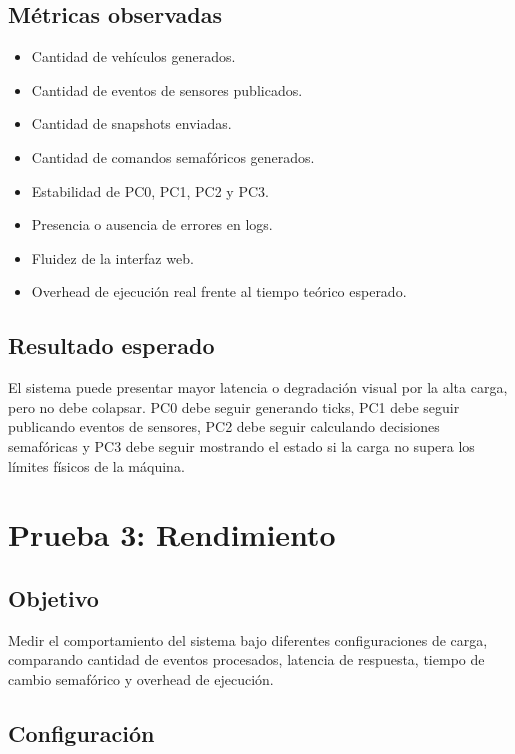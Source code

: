 \documentclass[12pt, a4paper]{article}
\begin{document}
\subsection{Métricas observadas}

\begin{itemize}
    \item Cantidad de vehículos generados.
    \item Cantidad de eventos de sensores publicados.
    \item Cantidad de snapshots enviadas.
    \item Cantidad de comandos semafóricos generados.
    \item Estabilidad de PC0, PC1, PC2 y PC3.
    \item Presencia o ausencia de errores en logs.
    \item Fluidez de la interfaz web.
    \item Overhead de ejecución real frente al tiempo teórico esperado.
\end{itemize}

\subsection{Resultado esperado}

El sistema puede presentar mayor latencia o degradación visual por la alta carga, pero no debe colapsar. PC0 debe seguir generando ticks, PC1 debe seguir publicando eventos de sensores, PC2 debe seguir calculando decisiones semafóricas y PC3 debe seguir mostrando el estado si la carga no supera los límites físicos de la máquina.

\section{Prueba 3: Rendimiento}

\subsection{Objetivo}

Medir el comportamiento del sistema bajo diferentes configuraciones de carga, comparando cantidad de eventos procesados, latencia de respuesta, tiempo de cambio semafórico y overhead de ejecución.

\subsection{Configuración}
\end{document}
